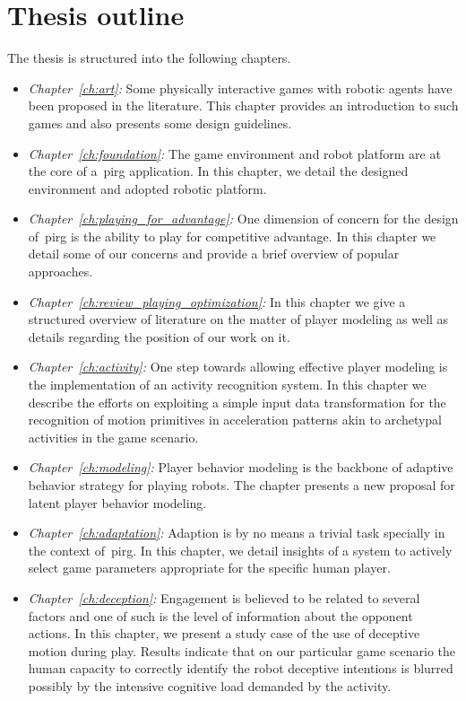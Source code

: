 \section{Thesis outline}
The thesis is structured into the following chapters.

\begin{itemize}
\item\emph{Chapter~\ref{ch:art}:} Some physically interactive games with robotic agents have been proposed in the literature. This chapter provides an introduction to such games and also presents some design guidelines. %
\item\emph{Chapter~\ref{ch:foundation}:} The game environment and robot platform are at the core of a~\gls{pirg} application. In this chapter, we detail the designed environment and adopted robotic platform.
\item\emph{Chapter~\ref{ch:playing_for_advantage}:} One dimension of concern for the design of~\gls{pirg} is the ability to play for competitive advantage. In this chapter we detail some of our concerns and provide a brief overview of popular approaches.
\item\emph{Chapter~\ref{ch:review_playing_optimization}:} In this chapter we give a structured overview of literature on the matter of player modeling as well as details regarding the position of our work on it.
\item\emph{Chapter~\ref{ch:activity}:} One step towards allowing effective player modeling is the implementation of an activity recognition system. In this chapter we describe the efforts on exploiting a simple input data transformation for the recognition of motion primitives in acceleration patterns akin to archetypal activities in the game scenario.
\item\emph{Chapter~\ref{ch:modeling}:} Player behavior modeling is the backbone of adaptive behavior strategy for playing robots. The chapter presents a new proposal for latent player behavior modeling.
\item\emph{Chapter~\ref{ch:adaptation}:} Adaption is by no means a trivial task specially in the context of~\gls{pirg}. In this chapter, we detail insights of a system to actively select game parameters appropriate for the specific human player.
\item\emph{Chapter~\ref{ch:deception}:} Engagement is believed to be related to several factors and one of such is the level of information about the opponent actions. In this chapter, we present a study case of the use of deceptive motion during play. Results indicate that on our particular game scenario the human capacity to correctly identify the robot deceptive intentions is blurred possibly by the intensive cognitive load demanded by the activity.

\end{itemize}
